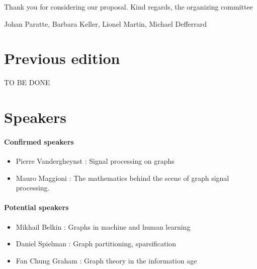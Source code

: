\documentclass[a4paper]{scrartcl}
\newcommand{\nati}[1]{{\textcolor[rgb]{.1,.6,.1}{#1}}}
\begin{document}
Thank you for considering our proposal. Kind regards, the organizing committee

\vspace{0.5cm}

Johan Paratte, Barbara Keller, Lionel Martin, Michael Defferrard









\newpage

\section{Previous edition}
\nati{TO BE DONE}

\section{Speakers}

\paragraph{Confirmed speakers}
\begin{itemize}
	\item Pierre Vandergheynst : Signal processing on graphs
	\item Mauro Maggioni : The mathematics behind the scene of graph signal processing.
\end{itemize}

\paragraph{Potential speakers}
\begin{itemize}
	\item Mikhail Belkin : Graphs in machine and human learning
	\item Daniel Spielman : Graph partitioning, sparsification
	\item Fan Chung Graham : Graph theory in the information age
\end{itemize}
\end{document}

